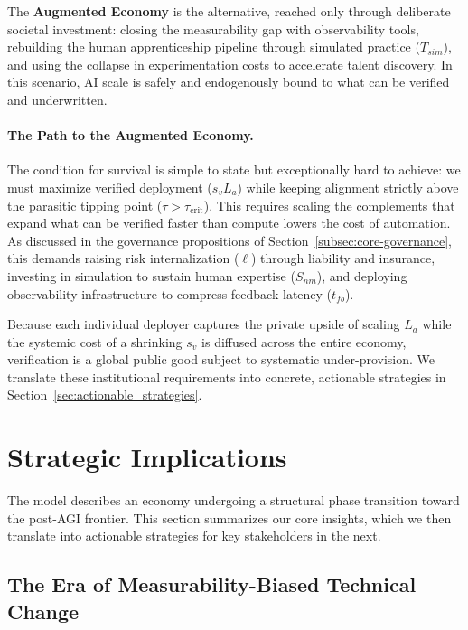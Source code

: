 \documentclass[12pt, letter]{article}
\begin{document}
The \textbf{Augmented Economy} is the alternative, reached only through deliberate societal investment: closing the measurability gap with observability tools, rebuilding the human apprenticeship pipeline through simulated practice ($T_{sim}$), and using the collapse in experimentation costs to accelerate talent discovery. In this scenario, AI scale is safely and endogenously bound to what can be verified and underwritten.

\paragraph{The Path to the Augmented Economy.}
The condition for survival is simple to state but exceptionally hard to achieve: we must maximize verified deployment ($s_v L_a$) while keeping alignment strictly above the parasitic tipping point ($\tau > \tau_{\mathrm{crit}}$). This requires scaling the complements that expand what can be verified faster than compute lowers the cost of automation. As discussed in the governance propositions of Section~\ref{subsec:core-governance}, this demands raising risk internalization ($\ell$) through liability and insurance, investing in simulation to sustain human expertise ($S_{nm}$), and deploying observability infrastructure to compress feedback latency ($t_{fb}$). 

Because each individual deployer captures the private upside of scaling $L_a$ while the systemic cost of a shrinking $s_v$ is diffused across the entire economy, verification is a global public good subject to systematic under-provision. We translate these institutional requirements into concrete, actionable strategies in Section~\ref{sec:actionable_strategies}.




\clearpage

\section{Strategic Implications}\label{sec:strategic_implications}

The model describes an economy undergoing a structural phase transition toward the post-AGI frontier. This section summarizes our core insights, which we then translate into actionable strategies for key stakeholders in the next.

\subsection{The Era of Measurability-Biased Technical Change} 
\end{document}
